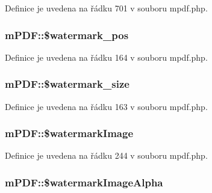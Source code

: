 Definice je uvedena na řádku 701 v souboru mpdf.\-php.

\hypertarget{classm_p_d_f_aec5f34e9a46d180fe6769c17f54b6e50}{
\subsubsection[{\$watermark\-\_\-pos}]{\setlength{\rightskip}{0pt plus 5cm}m\-P\-D\-F\-::\$watermark\-\_\-pos}}\label{classm_p_d_f_aec5f34e9a46d180fe6769c17f54b6e50}


Definice je uvedena na řádku 164 v souboru mpdf.\-php.

\hypertarget{classm_p_d_f_a8ec79be726fd8e5b845c70c44853c469}{
\subsubsection[{\$watermark\-\_\-size}]{\setlength{\rightskip}{0pt plus 5cm}m\-P\-D\-F\-::\$watermark\-\_\-size}}\label{classm_p_d_f_a8ec79be726fd8e5b845c70c44853c469}


Definice je uvedena na řádku 163 v souboru mpdf.\-php.

\hypertarget{classm_p_d_f_a7e89056334c3f65ca64a3cc80f156d5d}{
\subsubsection[{\$watermark\-Image}]{\setlength{\rightskip}{0pt plus 5cm}m\-P\-D\-F\-::\$watermark\-Image}}\label{classm_p_d_f_a7e89056334c3f65ca64a3cc80f156d5d}


Definice je uvedena na řádku 244 v souboru mpdf.\-php.

\hypertarget{classm_p_d_f_abb84267f02b5b9bc0a2f7085edf1edb4}{
\subsubsection[{\$watermark\-Image\-Alpha}]{\setlength{\rightskip}{0pt plus 5cm}m\-P\-D\-F\-::\$watermark\-Image\-Alpha}}\label{classm_p_d_f_abb84267f02b5b9bc0a2f7085edf1edb4}


